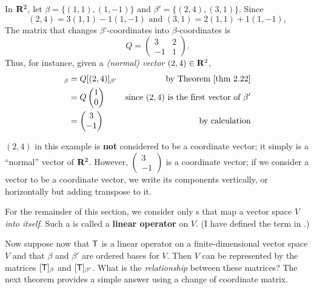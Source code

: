 \begin{example} \label{example 2.5.1}
In \(\mathbf{R}^2\), let \(\beta = \{ (1, 1), (1, -1) \}\) and \(\beta' = \{ (2, 4), (3, 1) \}\).
Since
\[
    (2, 4) = 3(1, 1) - 1(1, - 1) \text{ and } (3, 1) = 2(1, 1) + 1(1, -1),
\]
The matrix that changes \(\beta\)'-coordinates into \(\beta\)-coordinates is
\[
    Q = \begin{pmatrix} 3 & 2 \\ -1 & 1 \end{pmatrix}.
\]
Thus, for instance, given a \emph{(normal) vector} \((2, 4) \in \mathbf{R}^2\),
\begin{align*}
    [(2, 4)]_{\beta} & = Q[(2, 4)]_{\beta'} & \text{by \THM{2.22}} \\
                     & = Q \begin{pmatrix} 1 \\ 0 \end{pmatrix} & \text{since \((2, 4)\) is the first vector of \(\beta'\)} \\
                     & = \begin{pmatrix} 3 \\ -1 \end{pmatrix} & \text{by calculation}
\end{align*}
\end{example}

\begin{note}
\((2, 4)\) in this example is \textbf{not} considered to be a coordinate vector; it simply is a ``normal'' vector of \(\mathbf{R}^2\).
However, \(\begin{pmatrix} 3 \\ -1 \end{pmatrix}\) is a coordinate vector;
if we consider a vector to be a coordinate vector, we write its components vertically, or horizontally but adding transpose to it.
\end{note}

For the remainder of this section, we consider only \LTRAN{}s that map a vector space \(V\) \emph{into itself}.
Such a \LTRAN{} is called a \textbf{linear operator} on \(V\).
(I have defined the term in .)

Now suppose now that \(\textsf{T}\) is a linear operator on a finite-dimensional vector space \(V\) and that \(\beta\) and \(\beta'\) are ordered bases for \(V\).
Then \(V\) can be represented by the matrices \([\textsf{T}]_{\beta}\) and \([\textsf{T}]_{\beta'}\).
What is the \emph{relationship} between these matrices?
The next theorem provides a simple answer using a
change of coordinate matrix.

